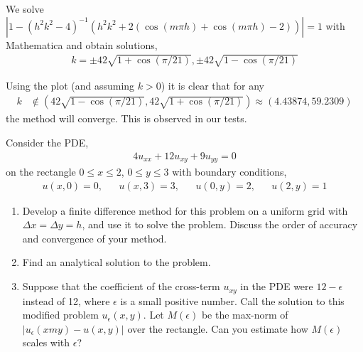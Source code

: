 \documentclass[10pt]{article}
\begin{document}
\begin{solution}[Solution]
\begin{enumerate}[label=(\alph*)]
We solve \( |1 - (h^2k^2-4)^{-1}(h^2k^2 + 2(\cos(m\pi h)+\cos(m\pi h)-2)) |=1 \) with Mathematica and obtain solutions,
\begin{align*}
    k = \pm 42\sqrt{1+\cos(\pi/21)}, \pm 42\sqrt{1-\cos(\pi/21)}
\end{align*}

Using the plot (and assuming \( k>0 \)) it is clear that for any
\begin{align*}
    k &\notin \left(42\sqrt{1-\cos(\pi/21)},42\sqrt{1+\cos(\pi/21)}\right) \approx(4.43874,59.2309)
\end{align*} the method will converge.
This is observed in our tests.

\end{enumerate}
\end{solution}


\begin{problem}
Consider the PDE,
\begin{align*}
    4u_{xx}+12u_{xy}+9u_{yy} = 0
\end{align*}
on the rectangle \( 0\leq x\leq 2 \), \( 0\leq y\leq 3 \) with boundary conditions,
\begin{align*}
    u(x,0) = 0, && u(x,3)=3, && u(0,y) = 2, && u(2,y)=1
\end{align*}
\begin{enumerate}[nolistsep]
\item Develop a finite difference method for this problem on a uniform grid with \( \Delta x =
\Delta y = h \), and use it to solve the problem. Discuss the order of accuracy and convergence of your method.
\item Find an analytical solution to the problem.
\item Suppose that the coefficient of the cross-term \( u_{xy} \) in the PDE were \( 12-\epsilon \) instead of 12, where \( \epsilon \) is a small positive number. Call the solution to this modified problem \( u_\epsilon(x, y) \). Let \( M(\epsilon) \) be the max-norm of \( |u_\epsilon(xm y) - u(x, y)| \) over the rectangle. Can you estimate how \( M(\epsilon) \) scales with \( \epsilon \)?
\end{enumerate}

\end{problem}
\end{document}
